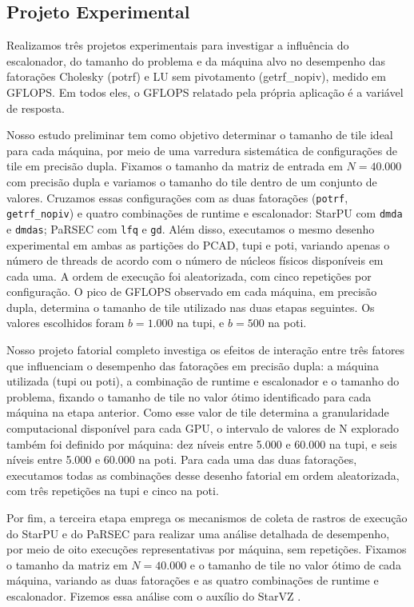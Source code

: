 \documentclass[12pt]{article}
\begin{document}
\subsection{Projeto Experimental}

Realizamos três projetos experimentais para investigar a influência do escalonador, do tamanho do problema e da máquina alvo no desempenho das fatorações Cholesky (potrf) e LU sem pivotamento (getrf\_nopiv), medido em GFLOPS. Em todos eles, o GFLOPS relatado pela própria aplicação é a variável de resposta.

Nosso estudo preliminar tem como objetivo determinar o tamanho de tile ideal para cada máquina, por meio de uma varredura sistemática de configurações de tile em precisão dupla. Fixamos o tamanho da matriz de entrada em $N=40.000$ com precisão dupla e variamos o tamanho do tile dentro de um conjunto de valores. Cruzamos essas configurações com as duas fatorações (\texttt{potrf}, \texttt{getrf\_nopiv}) e quatro combinações de runtime e escalonador: StarPU com \texttt{dmda} e \texttt{dmdas}; PaRSEC com \texttt{lfq} e \texttt{gd}. Além disso, executamos o mesmo desenho experimental em ambas as partições do PCAD, tupi e poti, variando apenas o número de threads de acordo com o número de núcleos físicos disponíveis em cada uma. A ordem de execução foi aleatorizada, com cinco repetições por configuração. O pico de GFLOPS observado em cada máquina, em precisão dupla, determina o tamanho de tile utilizado nas duas etapas seguintes. Os valores escolhidos foram $b=1.000$ na tupi, e $b=500$ na poti.

Nosso projeto fatorial completo investiga os efeitos de interação entre três fatores que influenciam o desempenho das fatorações em precisão dupla: a máquina utilizada (tupi ou poti), a combinação de runtime e escalonador e o tamanho do problema, fixando o tamanho de tile no valor ótimo identificado para cada máquina na etapa anterior. Como esse valor de tile determina a granularidade computacional disponível para cada GPU, o intervalo de valores de N explorado também foi definido por máquina: dez níveis entre 5.000 e 60.000 na tupi, e seis níveis entre 5.000 e 60.000 na poti. Para cada uma das duas fatorações, executamos todas as combinações desse desenho fatorial em ordem aleatorizada, com três repetições na tupi e cinco na poti.

Por fim, a terceira etapa emprega os mecanismos de coleta de rastros de execução do StarPU e do PaRSEC para realizar uma análise detalhada de desempenho, por meio de oito execuções representativas por máquina, sem repetições. Fixamos o tamanho da matriz em $N=40.000$ e o tamanho de tile no valor ótimo de cada máquina, variando as duas fatorações e as quatro combinações de runtime e escalonador. Fizemos essa análise com o auxílio do StarVZ \cite{Pinto2021ProvidingIP}.
\end{document}
